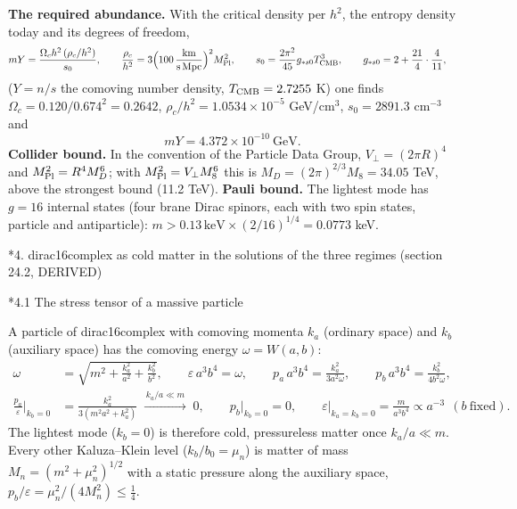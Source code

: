 \documentclass[10pt,a4paper]{article}
\makeatletter
\renewcommand\section{\@startsection{section}{1}{\z@}{-3.5ex \@plus -1ex \@minus -.2ex}{2.3ex \@plus.2ex}{\normalfont\Large\bfseries\raggedright}}
\renewcommand\subsection{\@startsection{subsection}{2}{\z@}{-3.25ex\@plus -1ex \@minus -.2ex}{1.5ex \@plus .2ex}{\normalfont\large\bfseries\raggedright}}
\makeatother
\begin{document}
\textbf{The required abundance.} With the critical density per $h^2$, the entropy density today and its degrees of freedom,
\begin{align*}
mY&=\frac{\Omega_ch^2\,(\rho_c/h^2)}{s_0},\qquad \frac{\rho_c}{h^2}=3\Big(100\,\frac{\rm km}{\rm s\,Mpc}\Big)^2M_{\rm Pl}^2,\qquad s_0=\frac{2\pi^2}{45}g_{*s0}T_{\rm CMB}^3,\qquad g_{*s0}=2+\frac{21}4\cdot\frac4{11},
\end{align*}
($Y=n/s$ the comoving number density, $T_{\rm CMB}=2.7255$ K) one finds $\Omega_c=0.120/0.674^2=0.2642$, $\rho_c/h^2=1.0534\times10^{-5}$ GeV/cm$^3$, $s_0=2891.3$ cm$^{-3}$ and
\begin{equation*}
mY=4.372\times10^{-10}\ \text{GeV}.
\end{equation*}
\textbf{Collider bound.} In the convention of the Particle Data Group, $V_\perp=(2\pi R)^4$ and $M_{\rm Pl}^2=R^4M_D^6$; with $M_{\rm Pl}^2=V_\perp M_8^6$ this is $M_D=(2\pi)^{2/3}M_8=34.05$ TeV, above the strongest bound (11.2 TeV). \textbf{Pauli bound.} The lightest mode has $g=16$ internal states (four brane Dirac spinors, each with two spin states, particle and antiparticle): $m>0.13\,\text{keV}\times(2/16)^{1/4}=0.0773$ keV.

\section*{4. dirac16complex as cold matter in the solutions of the three regimes (section 24.2, DERIVED)}
\subsection*{4.1 The stress tensor of a massive particle}
A particle of dirac16complex with comoving momenta $k_a$ (ordinary space) and $k_b$ (auxiliary space) has the comoving energy $\omega=W(a,b)$:
\begin{align*}
\omega&=\sqrt{m^2+\frac{k_a^2}{a^2}+\frac{k_b^2}{b^2}},\qquad \varepsilon\,a^3b^4=\omega,\qquad p_a\,a^3b^4=\frac{k_a^2}{3a^2\omega},\qquad p_b\,a^3b^4=\frac{k_b^2}{4b^2\omega}, \\
\frac{p_a}\varepsilon\Big|_{k_b=0}&=\frac{k_a^2}{3(m^2a^2+k_a^2)}\;\xrightarrow{\,k_a/a\ll m\,}\;0,\qquad p_b\big|_{k_b=0}=0,\qquad \varepsilon\big|_{k_a=k_b=0}=\frac m{a^3b^4}\propto a^{-3}\ \ (b\ \text{fixed}).
\end{align*}
The lightest mode ($k_b=0$) is therefore cold, pressureless matter once $k_a/a\ll m$. Every other Kaluza–Klein level ($k_b/b_0=\mu_n$) is matter of mass $M_n=(m^2+\mu_n^2)^{1/2}$ with a static pressure along the auxiliary space, $p_b/\varepsilon=\mu_n^2/(4M_n^2)\le\frac14$.
\end{document}
